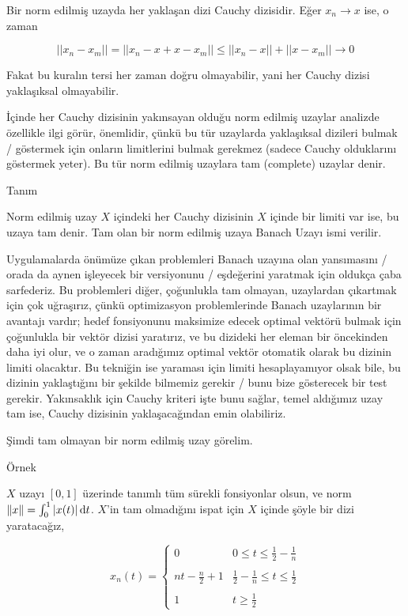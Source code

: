 \documentclass[12pt,fleqn]{article}\usepackage{../../common}
\begin{document}
Bir norm edilmiş uzayda her yaklaşan dizi Cauchy dizisidir. Eğer $x_n \to
x$ ise, o zaman 

$$ ||x_n - x_m|| = ||x_n -x +x -x_m|| \le 
||x_n - x|| + ||x-x_m|| \to 0
 $$

Fakat bu kuralın tersi her zaman doğru olmayabilir, yani her Cauchy dizisi
yaklaşıksal olmayabilir. 

İçinde her Cauchy dizisinin yakınsayan olduğu norm edilmiş uzaylar
analizde özellikle ilgi görür, önemlidir, çünkü bu tür uzaylarda
yaklaşıksal dizileri bulmak / göstermek için onların limitlerini bulmak
gerekmez (sadece Cauchy olduklarını göstermek yeter). Bu tür norm edilmiş
uzaylara tam (complete) uzaylar denir.

Tanım

Norm edilmiş uzay $X$ içindeki her Cauchy dizisinin $X$ içinde bir limiti
var ise, bu uzaya tam denir. Tam olan bir norm edilmiş uzaya Banach Uzayı
ismi verilir. 

Uygulamalarda önümüze çıkan problemleri Banach uzayına olan yansımasını /
orada da aynen işleyecek bir versiyonunu / eşdeğerini yaratmak için oldukça
çaba sarfederiz. Bu problemleri diğer, çoğunlukla tam olmayan, uzaylardan
çıkartmak için çok uğraşırız, çünkü optimizasyon problemlerinde Banach
uzaylarının bir avantajı vardır; hedef fonsiyonunu maksimize edecek optimal
vektörü bulmak için çoğunlukla bir vektör dizisi yaratırız, ve bu dizideki
her eleman bir öncekinden daha iyi olur, ve o zaman aradığımız optimal
vektör otomatik olarak bu dizinin limiti olacaktır. Bu tekniğin ise
yaraması için limiti hesaplayamıyor olsak bile, bu dizinin yaklaştığını bir
şekilde bilmemiz gerekir / bunu bize gösterecek bir test
gerekir. Yakınsaklık için Cauchy kriteri işte bunu sağlar, temel
aldığımız uzay tam ise, Cauchy dizisinin yaklaşacağından emin olabiliriz.

Şimdi tam olmayan bir norm edilmiş uzay görelim. 

Örnek

$X$ uzayı $[0,1]$ üzerinde tanımlı tüm sürekli fonsiyonlar olsun, ve norm
$\|x\| = \int_{0}^{1} |x(t)| \,\mathrm{d} t$. $X$'in tam olmadığını ispat için $X$
içinde şöyle bir dizi yaratacağız, 

$$ 
 x_n(t) =
\left\{ \begin{array}{ll}
0 &  0 \le t \le \frac{1}{2} - \frac{1}{n} \\ \\
nt-\frac{n}{2} + 1 &  \frac{1}{2} - \frac{1}{n} \le t \le \frac{1}{2} \\ \\
1 & t \ge \frac{1}{2}
\end{array} \right.
 $$
\end{document}
